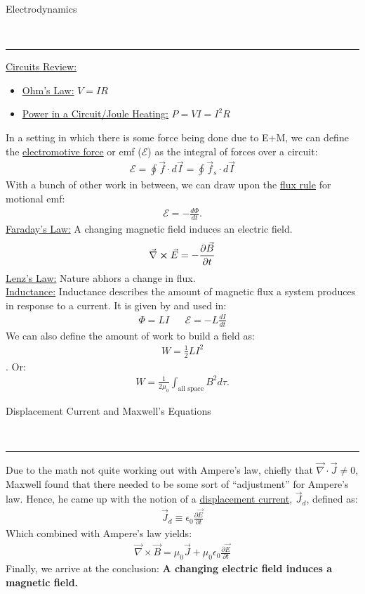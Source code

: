 \documentclass{article}
\newcommand{\header}[1]{\begin{large}\noindent #1\end{large}\\\rule{\textwidth}{0.5pt}}
\newcommand{\gap}{\medskip\\}
\newcommand{\sheader}[1]{\underline{#1:}}
\begin{document}
\header{Electrodynamics}
\sheader{Circuits Review} 
\begin{itemize}
    \item \sheader{Ohm's Law} $V = IR$
    \item \sheader{Power in a Circuit/Joule Heating} $P = VI = I^2 R$
\end{itemize}
In a setting in which there is some force being done due to E+M, we can define the 
\underline{electromotive force} or emf ($\mathcal{E}$) as the integral of forces over 
a circuit:
\begin{align*}
    \mathcal{E} = \oint \vec{f} \cdot d \vec{I} = \oint \vec{f}_s \cdot d \vec{I}
\end{align*}
With a bunch of other work in between, we can draw upon the \underline{flux rule}
for motional emf:
\begin{align*}
    \mathcal{E} = - \frac{d\Phi}{dt}.
\end{align*}
\sheader{Faraday's Law} A changing magnetic field induces an electric field.
\begin{align*}
    \vec{\nabla} \cross \vec{E} = - \frac{\partial \vec{B}}{\partial t}
\end{align*}
\sheader{Lenz's Law} Nature abhors a change in flux.
 \gap
\sheader{Inductance} Inductance describes the amount of magnetic flux a system produces
in response to a current. It is given by and used in:
\begin{align*}
    \Phi = LI && \mathcal{E} = -L \frac{dI}{dt}
\end{align*}
We can also define the amount of work to build a field as:
\begin{align*}
    W = \frac{1}{2}LI^2
\end{align*}.
Or:
\begin{align*}
    W = \frac{1}{2\mu_0}\int_\textrm{all space}B^2 d\tau.
\end{align*}

\header{Displacement Current and Maxwell's Equations}
Due to the math not quite working out with Ampere's law, chiefly that 
$\vec{\nabla} \cdot \vec{J} \neq 0$, Maxwell found that there needed to be some sort 
of ``adjustment'' for Ampere's law. Hence, he came up with the notion of a 
\underline{displacement current}, $\vec{J}_d$, defined as:
\begin{align*}
    \vec{J}_d \equiv \epsilon_0\frac{\partial \vec{E}}{\partial t}
\end{align*}
Which combined with Ampere's law yields:
\begin{align*}
    \vec{\nabla} \times \vec{B} = \mu_0 \vec{J} + \mu_0\epsilon_0 \frac{\partial \vec{E}}{\partial t}
\end{align*}
Finally, we arrive at the conclusion: \textbf{A changing electric field induces a magnetic field.}
\end{document}
